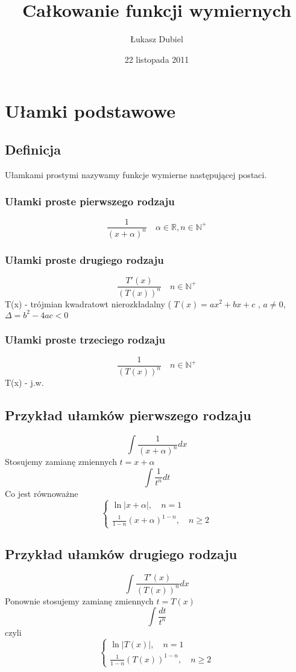 \documentclass[11pt]{article}
\author{Łukasz Dubiel}
\title{Całkowanie funkcji wymiernych}
\date{22 listopada 2011}
\begin{document}
\maketitle
\section{Ułamki podstawowe}
\subsection{Definicja}
Ułamkami prostymi nazywamy funkcje wymierne następującej postaci.
\subsubsection{Ułamki proste pierwszego rodzaju}
$$\frac{1}{(x + \alpha)^n} \quad \alpha \in \mathbb{R}, n \in \mathbb{N}^+$$
\subsubsection{Ułamki proste drugiego rodzaju}
$$\frac{T'(x)}{(T(x))^n} \quad n \in \mathbb{N}^+ $$
T(x) - trójmian kwadratowt nierozkładalny ( $ T(x) = ax^2 + bx + c $ , $a \not=0 $, $\Delta = b^2 - 4ac < 0$
\subsubsection{Ułamki proste trzeciego rodzaju}
$$\frac{1}{(T(x))^n} \quad n \in \mathbb{N}^+$$
T(x) - j.w. 
\subsection{Przykład ułamków pierwszego rodzaju}
$$\int \frac{1}{(x+\alpha)^n}dx$$
Stosujemy zamianę zmiennych $ t = x + \alpha $
$$\int \frac{1}{t^n}dt $$
Co jest równoważne
\begin{displaymath}
\begin{cases}
\ln{|x+\alpha|} , \quad n = 1 \\
\frac{1}{1-n}(x+\alpha)^{1-n}, \quad n \geq 2
\end{cases}
\end{displaymath}

\subsection{Przykład ułamków drugiego rodzaju}
$$\int \frac{T'(x)}{(T(x))^n}dx $$
Ponownie stosujemy zamianę zmiennych $ t = T(x) $
$$\int \frac{dt}{t^n}$$
czyli
\begin{displaymath}
\begin{cases}
\ln{|T(x)|} , \quad n = 1 \\
\frac{1}{1-n}(T(x))^{1-n}, \quad n \geq 2
\end{cases}
\end{displaymath}
\end{document}

